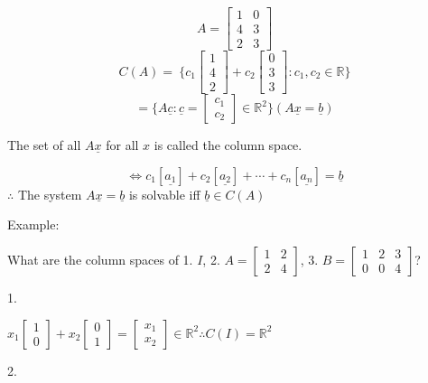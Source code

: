 \documentclass[12pt,a4paper]{article}
\begin{document}
\[
  A = 
  \begin{bmatrix}
    1 & 0 \\
    4 & 3 \\
    2 & 3
  \end{bmatrix}
\]
\[
C(A) = \
\{
  c_1
  \begin{bmatrix}
    1 \\
    4 \\
    2
  \end{bmatrix}
  + c_2
  \begin{bmatrix}
    0 \\
    3 \\
    3
  \end{bmatrix}
  : c_1, c_2 \in \mathbb{R}
\}
\]
\[
= 
\{
  A\underline{c}: \underline{c} = 
  \begin{bmatrix}
    c_1 \\
    c_2
  \end{bmatrix} \in \mathbb{R}^2
\} (A\underline{x} = \underline{b})
\]

The set of all $A\underline{x}$ for all $x$ is called the column space.

$$\iff c_1[\underline{a_1}] + c_2[\underline{a_2}] + \cdots + c_n[\underline{a_n}]  = \underline{b}$$
$\therefore$ The system $A\underline{x} = \underline{b}$ is solvable iff $\underline{b} \in C(A)$

Example:

What are the column spaces of 1. $I$, 2.
$
A = 
\begin{bmatrix}
  1 & 2 \\
  2 & 4
\end{bmatrix}
$, 
3. 
$
B = 
\begin{bmatrix}
  1 & 2 & 3 \\
  0 & 0 & 4
\end{bmatrix}
$?

1. 

$
x_1
\begin{bmatrix}
  1 \\
  0
\end{bmatrix} + 
x_2
\begin{bmatrix}
  0 \\
  1
\end{bmatrix} = 
\begin{bmatrix}
  x_1 \\
  x_2
\end{bmatrix} \in \mathbb{R}^2
\therefore C(I) = \mathbb{R}^2
$

2.
\end{document}
